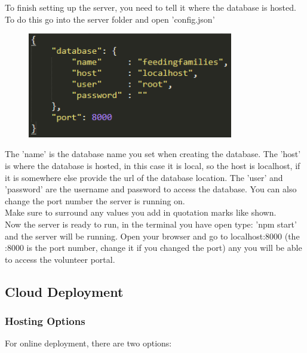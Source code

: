 \documentclass[12pt]{article}
\begin{document}
\noindent
To finish setting up the server, you need to tell it where the database is hosted. To do this go into the server folder and open 'config.json'
\begin{figure}[H]
    \centering
    \includegraphics[width=0.8\textwidth]{serversetup/config.png}
\end{figure}
\noindent
The 'name' is the database name you set when creating the database. The 'host' is where the database is hosted, in this case it is local, so the host is localhost, if it is somewhere else provide the url of the database location. The 'user' and 'password' are the username and password to access the database. You can also change the port number the server is running on.\\
\noindent
Make sure to surround any values you add in quotation marks like shown.\\

\noindent
Now the server is ready to run, in the terminal you have open type: 'npm start' and the server will be running. Open your browser and go to localhost:8000 (the :8000 is the port number, change it if you changed the port) any you will be able to access the volunteer portal.

\newpage
\subsection{Cloud Deployment}
\subsubsection{Hosting Options}

For online deployment, there are two options:
\end{document}

